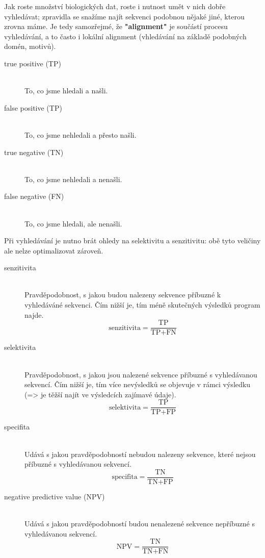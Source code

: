 \documentclass[DIV=8]{scrreprt}
\begin{document}
Jak roste množství biologických dat, roste i nutnost umět v nich dobře vyhledávat; zpravidla se snažíme najít sekvenci podobnou nějaké jiné, kterou zrovna máme. Je tedy samozřejmé, že \textbf{"alignment"} je součástí procesu vyhledávání, a to často i lokální alignment (vhledávání na základě podobných domén, motivů).

\begin{description}
\item[true positive (TP)]\hfill \\
To, co jsme hledali a našli.


\item[false positive (TP)]\hfill \\
To, co jsme nehledali a přesto našli.


\item[true negative (TN)]\hfill \\
To, co jsme nehledali a nenašli.


\item[false negative (FN)]\hfill \\
To, co jsme hledali, ale nenašli.

\end{description}


Při vyhledávání je nutno brát ohledy na selektivitu a senzitivitu: obě tyto veličiny ale nelze optimalizovat zároveň.

\begin{description}
\item[senzitivita]\hfill \\
Pravděpodobnost, s jakou budou nalezeny sekvence příbuzné k vyhledáváné sekvenci. Čím nižší je, tím méně skutečných výsledků program najde.
\[\text{senzitivita} = \frac{\text{TP}}{\text{TP} + \text{FN}}\]


\item[selektivita]\hfill \\
Pravděpodobnost, s jakou jsou nalezené sekvence příbuzné s vyhledávanou sekvencí. Čím nižší je, tím více nevýsledků se objevuje v rámci výsledku (=> je těžší najít ve výsledcích zajímavé údaje).
\[\text{selektivita} = \frac{\text{TP}}{\text{TP} + \text{FP}}\]


\item[specifita]\hfill \\
Udává s jakou pravděpodobností nebudou nalezeny sekvence, které nejsou příbuzné s vyhledávanou sekvencí.
\[\text{specifita} = \frac{\text{TN}}{\text{TN} + \text{FP}}\]


\item[negative predictive value (NPV)]\hfill \\
Udává s jakou pravděpodobností budou nenalezené sekvence nepříbuzné s vyhledávanou sekvencí.
\[\text{NPV} = \frac{\text{TN}}{\text{TN} + \text{FN}}\]

\end{description}
\end{document}

